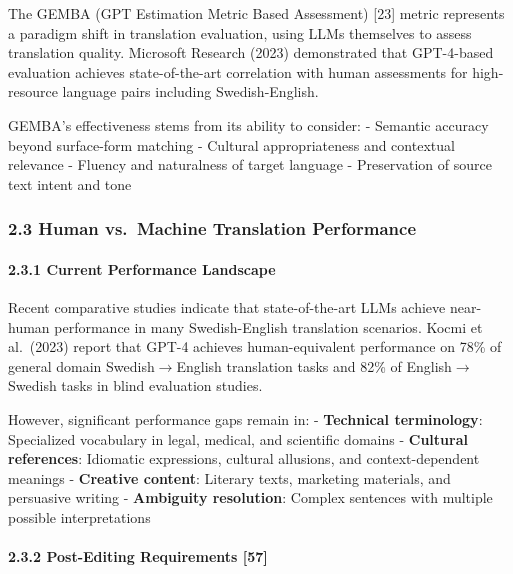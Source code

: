 \documentclass[12pt,a4paper]{article}
\begin{document}
{The GEMBA (GPT Estimation Metric Based Assessment) {[}23{]} metric
represents a paradigm shift in translation evaluation, using LLMs
themselves to assess translation quality. Microsoft Research (2023)
demonstrated that GPT-4-based evaluation achieves state-of-the-art
correlation with human assessments for high-resource language pairs
including Swedish-English.

GEMBA's effectiveness stems from its ability to consider: - Semantic
accuracy beyond surface-form matching - Cultural appropriateness and
contextual relevance - Fluency and naturalness of target language -
Preservation of source text intent and tone

\hypertarget{human-vs.-machine-translation-performance}{%
\subsubsection{2.3 Human vs.~Machine Translation
Performance}\label{human-vs.-machine-translation-performance}}

\hypertarget{current-performance-landscape}{%
\paragraph{2.3.1 Current Performance
Landscape}\label{current-performance-landscape}}

Recent comparative studies indicate that state-of-the-art LLMs achieve
near-human performance in many Swedish-English translation scenarios.
Kocmi et al.~(2023) report that GPT-4 achieves human-equivalent
performance on 78\% of general domain Swedish$\rightarrow$English translation tasks
and 82\% of English$\rightarrow$Swedish tasks in blind evaluation studies.

However, significant performance gaps remain in: - \textbf{Technical
terminology}: Specialized vocabulary in legal, medical, and scientific
domains - \textbf{Cultural references}: Idiomatic expressions, cultural
allusions, and context-dependent meanings - \textbf{Creative content}:
Literary texts, marketing materials, and persuasive writing -
\textbf{Ambiguity resolution}: Complex sentences with multiple possible
interpretations

\hypertarget{post-editing-requirements-57}{%
\paragraph{2.3.2 Post-Editing Requirements
{[}57{]}}\label{post-editing-requirements-57}}

}
\end{document}
